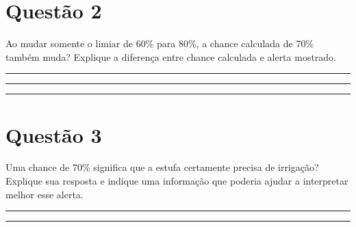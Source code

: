 \documentclass[12pt,a4paper]{article}
\newcommand{\linha}{\rule{\linewidth}{0.35pt}}
\begin{document}
\section*{Questão 2}

Ao mudar somente o limiar de 60\% para 80\%, a chance calculada de 70\% também muda? Explique a diferença entre chance calculada e alerta mostrado.

\vspace{0.25em}
\linha\par\vspace{0.75em}
\linha\par\vspace{0.75em}
\linha

\section*{Questão 3}

Uma chance de 70\% significa que a estufa certamente precisa de irrigação? Explique sua resposta e indique uma informação que poderia ajudar a interpretar melhor esse alerta.

\vspace{0.25em}
\linha\par\vspace{0.75em}
\linha
\end{document}
